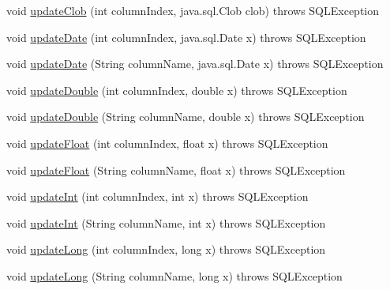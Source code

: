 \begin{DoxyCompactItemize}
void \mbox{\hyperlink{classcom_1_1mysql_1_1cj_1_1jdbc_1_1result_1_1_updatable_result_set_adbbf08a2da624a52ab2585084588912d}{update\+Clob}} (int column\+Index, java.\+sql.\+Clob clob)  throws S\+Q\+L\+Exception 
\item 
void \mbox{\hyperlink{classcom_1_1mysql_1_1cj_1_1jdbc_1_1result_1_1_updatable_result_set_a2990155ee7e12af7c254ef5a52dcda3b}{update\+Date}} (int column\+Index, java.\+sql.\+Date x)  throws S\+Q\+L\+Exception 
\item 
void \mbox{\hyperlink{classcom_1_1mysql_1_1cj_1_1jdbc_1_1result_1_1_updatable_result_set_a9d7d6087e923469e0c6c936848aedd4b}{update\+Date}} (String column\+Name, java.\+sql.\+Date x)  throws S\+Q\+L\+Exception 
\item 
void \mbox{\hyperlink{classcom_1_1mysql_1_1cj_1_1jdbc_1_1result_1_1_updatable_result_set_a6f39d8f67b74278119bd6529ad3ce812}{update\+Double}} (int column\+Index, double x)  throws S\+Q\+L\+Exception 
\item 
void \mbox{\hyperlink{classcom_1_1mysql_1_1cj_1_1jdbc_1_1result_1_1_updatable_result_set_aff5e97b1a01e3a852ad8bb86db540ea5}{update\+Double}} (String column\+Name, double x)  throws S\+Q\+L\+Exception 
\item 
void \mbox{\hyperlink{classcom_1_1mysql_1_1cj_1_1jdbc_1_1result_1_1_updatable_result_set_a78afa9bf3b02222e126212ae37b315c7}{update\+Float}} (int column\+Index, float x)  throws S\+Q\+L\+Exception 
\item 
void \mbox{\hyperlink{classcom_1_1mysql_1_1cj_1_1jdbc_1_1result_1_1_updatable_result_set_a958a7e0481c7bbe921d55a187161c5b5}{update\+Float}} (String column\+Name, float x)  throws S\+Q\+L\+Exception 
\item 
void \mbox{\hyperlink{classcom_1_1mysql_1_1cj_1_1jdbc_1_1result_1_1_updatable_result_set_a65337b38cd930c9b8a5e0de9bb1e7cd6}{update\+Int}} (int column\+Index, int x)  throws S\+Q\+L\+Exception 
\item 
void \mbox{\hyperlink{classcom_1_1mysql_1_1cj_1_1jdbc_1_1result_1_1_updatable_result_set_ad436bf369d85a1ddcd17a09509ce1bc8}{update\+Int}} (String column\+Name, int x)  throws S\+Q\+L\+Exception 
\item 
void \mbox{\hyperlink{classcom_1_1mysql_1_1cj_1_1jdbc_1_1result_1_1_updatable_result_set_ab16712b76cb0a3d4135c26212979e33a}{update\+Long}} (int column\+Index, long x)  throws S\+Q\+L\+Exception 
\item 
void \mbox{\hyperlink{classcom_1_1mysql_1_1cj_1_1jdbc_1_1result_1_1_updatable_result_set_aff65ae57f836c6e578bd26b4d1fe3155}{update\+Long}} (String column\+Name, long x)  throws S\+Q\+L\+Exception 

\end{DoxyCompactItemize}
